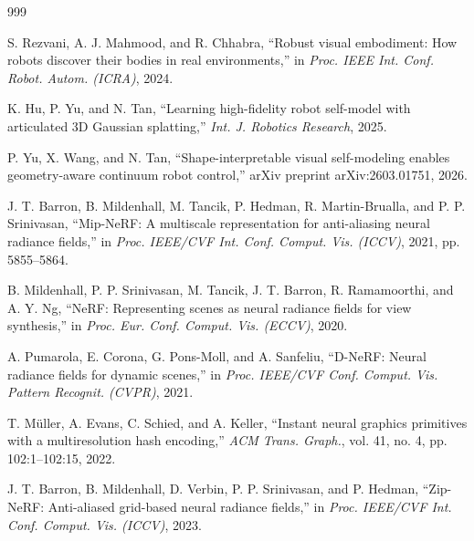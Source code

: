 \documentclass[12pt,a4paper,oneside]{report}
\begin{document}
\begin{thebibliography}{999}

S. Rezvani, A. J. Mahmood, and R. Chhabra, ``Robust visual embodiment: How robots discover their bodies in real environments,'' in \textit{Proc. IEEE Int. Conf. Robot. Autom. (ICRA)}, 2024.




K. Hu, P. Yu, and N. Tan, ``Learning high-fidelity robot self-model with articulated {3D} Gaussian splatting,'' \textit{Int. J. Robotics Research}, 2025.




P. Yu, X. Wang, and N. Tan, ``Shape-interpretable visual self-modeling enables geometry-aware continuum robot control,'' arXiv preprint arXiv:2603.01751, 2026.




J. T. Barron, B. Mildenhall, M. Tancik, P. Hedman, R. Martin-Brualla, and P. P. Srinivasan, ``{Mip-NeRF}: A multiscale representation for anti-aliasing neural radiance fields,'' in \textit{Proc. IEEE/CVF Int. Conf. Comput. Vis. (ICCV)}, 2021, pp. 5855--5864.




B. Mildenhall, P. P. Srinivasan, M. Tancik, J. T. Barron, R. Ramamoorthi, and A. Y. Ng, ``NeRF: Representing scenes as neural radiance fields for view synthesis,'' in \textit{Proc. Eur. Conf. Comput. Vis. (ECCV)}, 2020.




A. Pumarola, E. Corona, G. Pons-Moll, and A. Sanfeliu, ``D-NeRF: Neural radiance fields for dynamic scenes,'' in \textit{Proc. IEEE/CVF Conf. Comput. Vis. Pattern Recognit. (CVPR)}, 2021.




T. M\"uller, A. Evans, C. Schied, and A. Keller, ``Instant neural graphics primitives with a multiresolution hash encoding,'' \textit{ACM Trans. Graph.}, vol. 41, no. 4, pp. 102:1--102:15, 2022.




J. T. Barron, B. Mildenhall, D. Verbin, P. P. Srinivasan, and P. Hedman, ``Zip-NeRF: Anti-aliased grid-based neural radiance fields,'' in \textit{Proc. IEEE/CVF Int. Conf. Comput. Vis. (ICCV)}, 2023.




\end{thebibliography}
\end{document}
